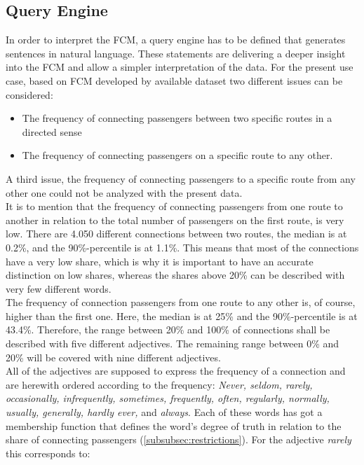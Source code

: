 \documentclass[conference]{IEEEtran}
\begin{document}
\subsection{Query Engine}
\label{subsec:queryengine}
In order to interpret the FCM, a query engine has to be defined that generates sentences in natural language. These statements are delivering a deeper insight into the FCM and allow a simpler interpretation of the data. For the present use case, based on FCM developed by available dataset two different issues can be considered: 
\begin{itemize}
\item The frequency of connecting passengers between two specific routes in a directed sense
\item The frequency of connecting passengers on a specific route to any other.
\end{itemize}
A third issue, the frequency of connecting passengers to a specific route from any other one could not be analyzed with the present data.\\
It is to mention that the frequency of connecting passengers from one route to another in relation to the total number of passengers on the first route, is very low. There are 4.050 different connections between two routes, the median is at 0.2\%, and the 90\%-percentile is at 1.1\%. This means that most of the connections have a very low share, which is why it is important to have an accurate distinction on low shares, whereas the shares above 20\% can be described with very few different words.\\
The frequency of connection passengers from one route to any other is, of course, higher than the first one. Here, the median is at 25\% and the 90\%-percentile is at 43.4\%. Therefore, the range between 20\% and 100\% of connections shall be described with five different adjectives. The remaining range between 0\% and 20\% will be covered with nine different adjectives.\\
All of the adjectives are supposed to express the frequency of a connection and are herewith ordered according to the frequency: \emph{Never, seldom, rarely, occasionally, infrequently, sometimes, frequently, often, regularly, normally, usually, generally, hardly ever,} and \emph{always}. Each of these words has got a membership function that defines the word's degree of truth in relation to the share of connecting passengers (\ref{subsubsec:restrictions}). For the adjective \emph{rarely} this corresponds to:
\end{document}
